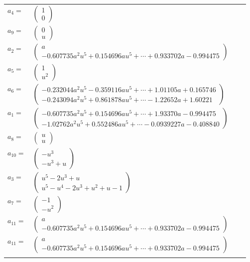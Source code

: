 \documentclass[1p]{elsarticle_modified}
\theoremstyle{definition}
\begin{document}
\begin{tabular}{m{7pt} m{180pt} m{7pt} m{180pt} }
\flushright $a_{4}=$&$\begin{pmatrix}1\\0\end{pmatrix}$ \\
\flushright $a_{9}=$&$\begin{pmatrix}0\\u\end{pmatrix}$ \\
\flushright $a_{2}=$&$\begin{pmatrix}a\\-0.607735 a^{2} u^{5}+0.154696 a u^{5}+\cdots+0.933702 a-0.994475\end{pmatrix}$ \\
\flushright $a_{5}=$&$\begin{pmatrix}1\\u^2\end{pmatrix}$ \\
\flushright $a_{6}=$&$\begin{pmatrix}-0.232044 a^{2} u^{5}-0.359116 a u^{5}+\cdots+1.01105 a+0.165746\\-0.243094 a^{2} u^{5}+0.861878 a u^{5}+\cdots-1.22652 a+1.60221\end{pmatrix}$ \\
\flushright $a_{1}=$&$\begin{pmatrix}-0.607735 a^{2} u^{5}+0.154696 a u^{5}+\cdots+1.93370 a-0.994475\\-1.02762 a^{2} u^{5}+0.552486 a u^{5}+\cdots-0.0939227 a-0.408840\end{pmatrix}$ \\
\flushright $a_{8}=$&$\begin{pmatrix}u\\u\end{pmatrix}$ \\
\flushright $a_{10}=$&$\begin{pmatrix}- u^3\\- u^3+u\end{pmatrix}$ \\
\flushright $a_{3}=$&$\begin{pmatrix}u^5-2 u^3+u\\u^5- u^4-2 u^3+u^2+u-1\end{pmatrix}$ \\
\flushright $a_{7}=$&$\begin{pmatrix}-1\\- u^2\end{pmatrix}$ \\
\flushright $a_{11}=$&$\begin{pmatrix}a\\-0.607735 a^{2} u^{5}+0.154696 a u^{5}+\cdots+0.933702 a-0.994475\end{pmatrix}$\\ \flushright $a_{11}=$&$\begin{pmatrix}a\\-0.607735 a^{2} u^{5}+0.154696 a u^{5}+\cdots+0.933702 a-0.994475\end{pmatrix}$\\&\end{tabular}
\end{document}
